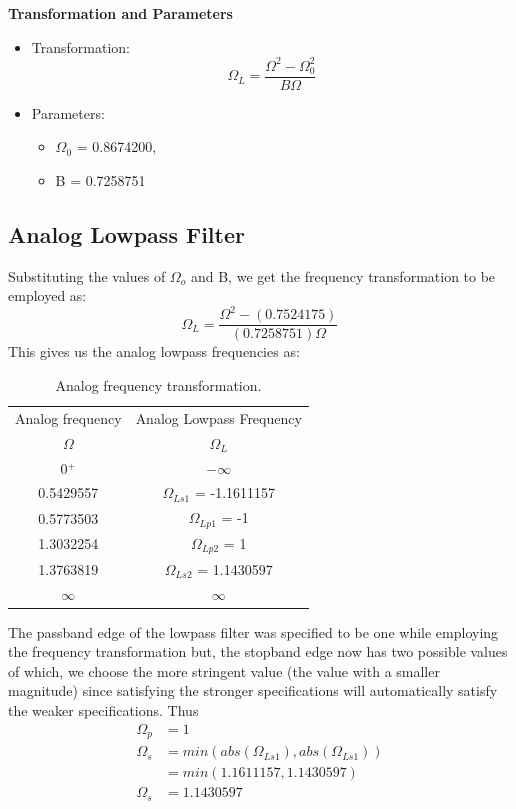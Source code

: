 \documentclass[12pt]{article}
\begin{document}
\hline
\vspace{10pt}
\textbf{Transformation and Parameters}
\begin{itemize}
    \item Transformation:\[\Omega_L = \frac{\Omega^2 - \Omega_0^2}{B\Omega}\]
    \item Parameters:
    \begin{itemize}
        \item $\Omega_0$ = 0.8674200,
        \item B = 0.7258751
    \end{itemize}
\end{itemize}
\hline
\newpage
\subsection{Analog Lowpass Filter}
Substituting the values of $\Omega_o$ and B, we get the frequency transformation to be employed as:
\[\Omega_L = \frac{\Omega^2 - (0.7524175)}{(0.7258751)\Omega}\]
This gives us the analog lowpass frequencies as:
\begin{table}[h]
    \centering
    \begin{tabular}{|c|c|}\hline
         Analog frequency&Analog Lowpass Frequency\\
         $\Omega$ &$\Omega_L$\\\hline
         0$^+$&$-\infty$\\\hline
         0.5429557&$\Omega_{Ls1}$ = -1.1611157\\\hline
         0.5773503&$\Omega_{Lp1}$ = -1\\\hline
         1.3032254&$\Omega_{Lp2}$ = 1\\\hline
         1.3763819&$\Omega_{Ls2}$ = 1.1430597\\\hline
         $\infty$&$\infty$\\\hline
    \end{tabular}
    \caption{Analog frequency transformation.}
    \label{tab:3}
\end{table}

The passband edge of the lowpass filter was specified to be one while employing the frequency transformation but, the stopband edge now has two possible values of which, we choose the more stringent value (the value with a smaller magnitude) since satisfying the stronger specifications will automatically satisfy the weaker specifications. Thus
\begin{align*}
    \Omega_p &= 1\\
    \Omega_s &= min(abs(\Omega_{Ls1}), abs(\Omega_{Ls1}))\\
    &= min(1.1611157, 1.1430597)\\
    \Omega_s &= 1.1430597
\end{align*}
\end{document}
